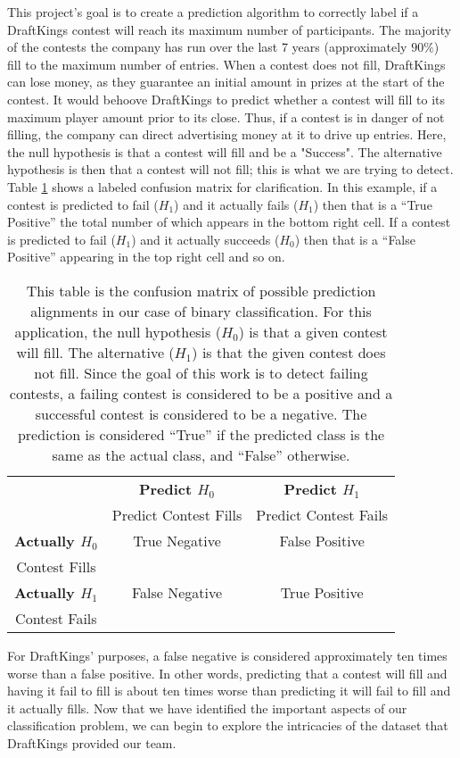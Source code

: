 This project's goal is to create a prediction algorithm to correctly label if a DraftKings contest will reach its maximum number of participants. The majority of the contests the company has run over the last 7 years (approximately $90\%$) fill to the maximum number of entries. When a contest does not fill, DraftKings can lose money, as they guarantee an initial amount in prizes at the start of the contest. It would behoove DraftKings to predict whether a contest will fill to its maximum player amount prior to its close. Thus, if a contest is in danger of not filling, the company can direct advertising money at it to drive up entries. Here, the null hypothesis is that a contest will fill and be a "Success". The alternative hypothesis is then that a contest will not fill; this is what we are trying to detect. Table \ref{tab:confmat} shows a labeled confusion matrix for clarification. In this example, if a contest is predicted to fail ($H_{1}$) and it actually fails ($H_{1}$) then that is a ``True Positive'' the total number of which appears in the bottom right cell. If a contest is predicted to fail ($H_{1}$) and it actually succeeds ($H_{0}$) then that is a ``False Positive'' appearing in the top right cell and so on.

\begin{table}
\centering
\begin{tabular}{| c | c | c |}
\hline
 & \textbf{Predict $H_{0}$} & \textbf{Predict $H_{1}$}  \\ 
 & Predict Contest Fills & Predict Contest Fails \\
\hline
\textbf{Actually $H_{0}$} & True Negative & False Positive  \\ 
Contest Fills & & \\
\hline
\textbf{Actually $H_{1}$} & False Negative & True Positive  \\
Contest Fails & & \\
\hline
\end{tabular}
\caption{This table is the confusion matrix of possible prediction alignments in our case of binary classification. For this application, the null hypothesis ($H_{0}$) is that a given contest will fill. The alternative ($H_{1}$) is that the given contest does not fill. Since the goal of this work is to detect failing contests, a failing contest is considered to be a positive and a successful contest is considered to be a negative. The prediction is considered ``True'' if the predicted class is the same as the actual class, and ``False'' otherwise.}
\label{tab:confmat}
\end{table}

For DraftKings' purposes, a false negative is considered approximately ten times worse than a false positive. In other words, predicting that a contest will fill and having it fail to fill is about ten times worse than predicting it will fail to fill and it actually fills. Now that we have identified the important aspects of our classification problem, we can begin to explore the intricacies of the dataset that DraftKings provided our team. 
 